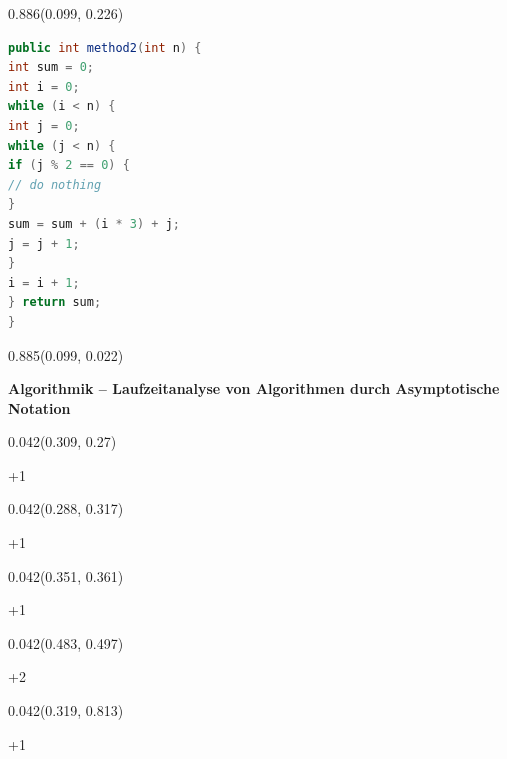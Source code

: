 \documentclass[aspectratio=169]{beamer}
\begin{document}
\begin{frame}[fragile]
\begin{textblock}{0.886}(0.099, 0.226)
  \begin{minipage}[t][0.63\paperheight]{\linewidth}
    \begin{lstlisting}[language=Java, basicstyle=\ttfamily\scriptsize]
public int method2(int n) {
int sum = 0;
int i = 0;
while (i < n) {
int j = 0;
while (j < n) {
if (j % 2 == 0) {
// do nothing
}
sum = sum + (i * 3) + j;
j = j + 1;
}
i = i + 1;
} return sum;
}
    \end{lstlisting}
  \end{minipage}
\end{textblock}
\begin{textblock}{0.885}(0.099, 0.022)
  \begin{minipage}[b][0.031\paperheight]{\linewidth}
    \fontsize{3}{3.3}\selectfont
    \textbf{Algorithmik – Laufzeitanalyse von Algorithmen durch Asymptotische Notation}
  \end{minipage}
\end{textblock}
\begin{textblock}{0.042}(0.309, 0.27)
  \begin{minipage}[t][0.044\paperheight]{\linewidth}
    {\tiny +1}
  \end{minipage}
\end{textblock}
\begin{textblock}{0.042}(0.288, 0.317)
  \begin{minipage}[t][0.044\paperheight]{\linewidth}
    {\tiny +1}
  \end{minipage}
\end{textblock}
\begin{textblock}{0.042}(0.351, 0.361)
  \begin{minipage}[t][0.044\paperheight]{\linewidth}
    {\tiny +1}
  \end{minipage}
\end{textblock}
\begin{textblock}{0.042}(0.483, 0.497)
  \begin{minipage}[t][0.044\paperheight]{\linewidth}
    {\tiny +2}
  \end{minipage}
\end{textblock}
\begin{textblock}{0.042}(0.319, 0.813)
  \begin{minipage}[t][0.044\paperheight]{\linewidth}
    {\tiny +1}
  \end{minipage}
\end{textblock}

\end{frame}
\end{document}
